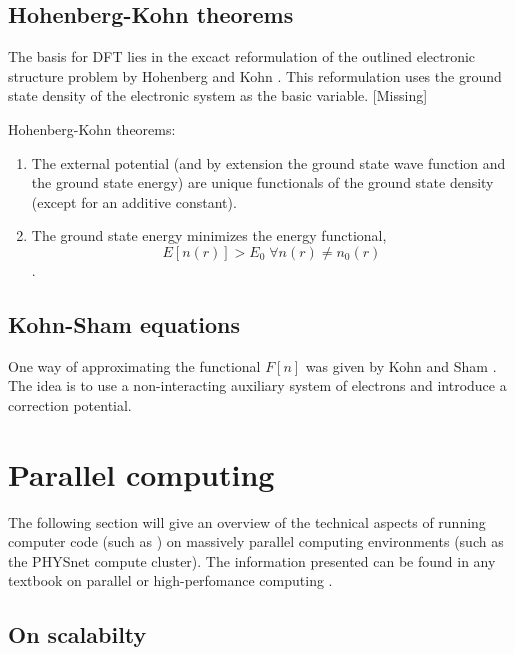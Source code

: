 \documentclass[\main/main.tex]{subfiles}
\begin{document}

\subsection{Hohenberg-Kohn theorems}

The basis for DFT lies in the excact reformulation of the outlined electronic structure problem by Hohenberg and Kohn \cite{hohenberg_inhomogeneous_1964}.
This reformulation uses the ground state density of the electronic system as the basic variable.
[Missing]

Hohenberg-Kohn theorems:

\begin{enumerate}[I]
    \item The external potential (and by extension the ground state wave function and the ground state energy) are  unique functionals of the ground state density (except for an additive constant).
    \item The ground state energy minimizes the energy functional,
    \[E[n(r)] > E_0 \;\forall n(r) \neq n_0 (r)\].
\end{enumerate}

\subsection{Kohn-Sham equations}

One way of approximating the functional \(F[n]\) was given by Kohn and Sham \cite{kohn_self-consistent_1965}. The idea is to use a non-interacting
auxiliary system of electrons and introduce a correction potential. 

\section{Parallel computing\label{sec:parallel_computing}}

The following section will give an overview of the technical aspects of running computer code (such as \QE) on massively parallel computing environments (such as the PHYSnet compute cluster).
The information presented can be found in any textbook on parallel or high-perfomance computing \cite{hager_introduction_2010}.

\subsection{On scalabilty}
\end{document}
